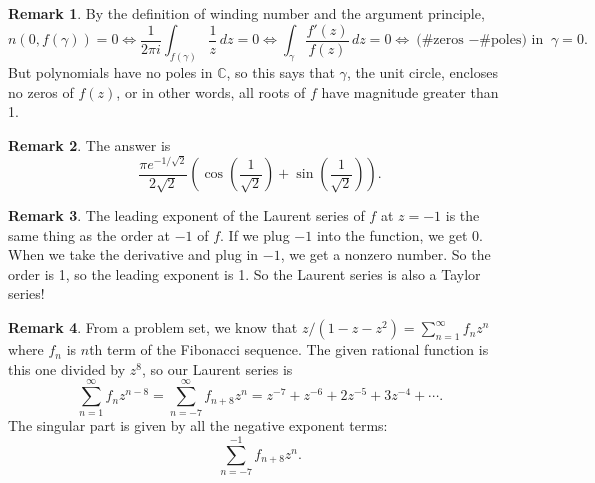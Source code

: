 \documentclass[11pt,oneside]{amsart}
\theoremstyle{definition}
\newtheorem{remark}{Remark}
\newcommand{\bC}{\mathbb{C}}
\begin{document}
\begin{remark} %
  By the definition of winding number and the argument principle,
  \[n(0,f(\gamma))=0\iff\frac 1{2\pi i}\int_{f(\gamma)}\frac 1z\,dz=0\iff \int_\gamma \frac{f'(z)}{f(z)}\,dz=0\iff \text{(\# zeros $-$\# poles) in }\gamma=0.\]
  But polynomials have no poles in $\bC$, so this says that $\gamma$, the unit circle, encloses no zeros of $f(z)$, or in other words, all roots of $f$ have magnitude greater than 1.
\end{remark}

\begin{remark} %
  The answer is
  \[\frac{\pi e^{-1/\sqrt 2}}{2\sqrt 2}\left( \cos\left( \frac 1{\sqrt2} \right) +\sin\left( \frac 1{\sqrt 2} \right)\right).\]
\end{remark}

\begin{remark} %
  The leading exponent of the Laurent series of $f$ at $z=-1$ is the same thing as the order at $-1$ of $f$. If we plug $-1$ into the function, we get 0. When we take the derivative and plug in $-1$, we get a nonzero number. So the order is 1, so the leading exponent is 1. So the Laurent series is also a Taylor series!
\end{remark}

\begin{remark} %
  From a problem set, we know that $z/(1-z-z^2)=\sum_{n=1}^\infty f_nz^n$ where $f_n$ is $n$th term of the Fibonacci sequence. The given rational function is this one divided by $z^8$, so our Laurent series is
  \[\sum_{n=1}^\infty f_n z^{n-8}=\sum_{n=-7}^\infty f_{n+8}z^n=z^{-7}+z^{-6}+2z^{-5}+3z^{-4}+\cdots.\]
  The singular part is given by all the negative exponent terms:
  \[\sum_{n=-7}^{-1}f_{n+8}z^n.\]
\end{remark}
\end{document}
